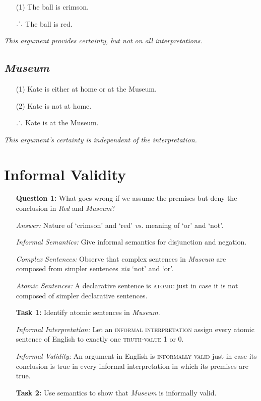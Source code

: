 \documentclass[a4paper, 11pt]{article} %
\def\therefore{\ensuremath{\ldotp\dot{}\,\ldotp}}
\begin{document}
\begin{enumerate}
  \item[(1)] The ball is crimson.
  \item[\therefore] The ball is red.
\end{enumerate}

\noindent
\textit{This argument provides certainty, but not on all interpretations.}

\subsection*{\it \textbf{Museum}}

\begin{enumerate}
  \item[(1)] Kate is either at home or at the Museum.
  \item[(2)] Kate is not at home.
  \item[\therefore] Kate is at the Museum.
\end{enumerate}

\noindent
\textit{This argument's certainty is independent of the interpretation.}


\section*{Informal Validity}

\begin{enumerate}[leftmargin=1.2in,labelsep=.15in] %
  \item[\bf Question 1:] What goes wrong if we assume the premises but deny the conclusion in \textit{Red} and \textit{Museum}?
  \item[\it Answer:] Nature of `crimson' and `red' \textit{vs.} meaning of `or' and `not'.
  \item[\it Informal Semantics:] Give informal semantics for disjunction and negation.
  \item[\it Complex Sentences:] Observe that complex sentences in \textit{Museum} are composed from simpler sentences \textit{via} `not' and `or'.
  \item[\it Atomic Sentences:] A declarative sentence is \textsc{atomic} just in case it is not composed of simpler declarative sentences.
  \item[\bf Task 1:] Identify atomic sentences in \textit{Museum}.
  \item[\it Informal Interpretation:] Let an \textsc{informal interpretation} assign every atomic sentence of English to exactly one \textsc{truth-value} 1 or 0.
  \item[\it Informal Validity:] An argument in English is \textsc{informally valid} just in case its conclusion is true in every informal interpretation in which its premises are true.
  \item[\bf Task 2:] Use semantics to show that \textit{Museum} is informally valid.
\end{enumerate}
\end{document}
